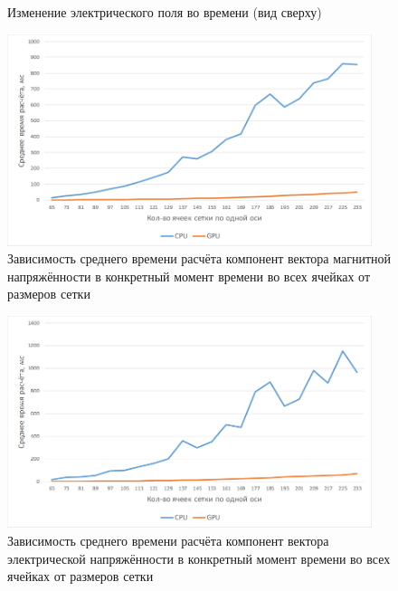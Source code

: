 \begin{figure}[p]
\begin{subfigure}[b]{0.3\textwidth}
        \label{fieldFig:6th}
    \end{subfigure}

    \caption{Изменение электрического поля во времени (вид сверху)}\label{fig:animals}
\end{figure}
\clearpage
\begin{figure}[p]
\centering
\includegraphics[width=0.95\textwidth]{include/graphics/image12}
\caption{Зависимость среднего времени расчёта компонент вектора магнитной напряжённости в конкретный момент времени во всех ячейках от размеров сетки}
\label{fig:1stComparsion}
\end{figure}
\begin{figure}[p]
\centering
\includegraphics[width=0.95\textwidth]{include/graphics/image13}
\caption{Зависимость среднего времени расчёта компонент вектора электрической напряжённости в конкретный момент времени во всех ячейках от размеров сетки}
\label{fig:2ndComparsion}
\end{figure}

\clearpage